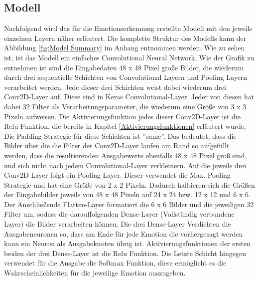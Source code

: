 \documentclass[12pt, a4paper]{report}
\begin{document}
\subsection{Modell}
Nachfolgend wird das für die Emotionserkennung erstellte Modell mit den jeweils einzelnen Layern näher erläutert. Die komplette Struktur des Modells kann der Abbildung \ref{fig:Model Summary} im Anhang entnommen werden.
Wie zu sehen ist, ist das Modell ein einfaches Convolutional Neural Network. 
Wie der Grafik zu entnehmen ist sind die Eingabedaten 48 x 48 Pixel große Bilder, die wiederum durch drei sequentielle Schichten von Convolutional Layern und Pooling Layern verarbeitet werden. Jede dieser drei Schichten weist dabei wiederum drei Conv2D-Layer auf. Diese sind in Keras Convolutional-Layer. Jeder von diesen hat dabei 32 Filter als Verarbeitungsparameter, die wiederum eine Größe von 3 x 3 Pixeln aufweisen. Die Aktivierungsfunktion jedes dieser Conv2D-Layer ist die Relu Funktion, die bereits in Kapitel \ref{Aktivierungsfunktionen} erläutert wurde. Die Padding-Strategie für diese Schichten ist ''same''. Das bedeutet, dass die Bilder über die die Filter der Conv2D-Layer laufen am Rand so aufgefüllt werden, dass die resultierenden Ausgabewerte ebenfalls 48 x 48 Pixel groß sind, und sich nicht nach jedem  Convolutional-Layer verkleinern. Auf die jeweils drei Conv2D-Layer folgt ein Pooling Layer. Dieser verwendet die Max. Pooling Strategie und hat eine Größe von 2 x 2 Pixeln. Dadurch halbieren sich die Größen der Eingabebilder jeweils von 48 x 48 Pixeln auf 24 x 24 bzw. 12 x 12 und 6 x 6. Der Anschließende Flatten-Layer formatiert die 6 x 6 Bilder und die jeweiligen 32 Filter um, sodass die darauffolgenden Dense-Layer (Vollständig verbundene Layer) die Bilder verarbeiten können. Die drei Dense-Layer Verdichten die Ausgabeneuronen so, dass am Ende für jede Emotion die vorhergesagt werden kann ein Neuron als Ausgabeknoten übrig ist. Aktivierungsfunktionen der ersten beiden der drei Dense-Layer ist die Relu Funktion. Die Letzte Schicht hingegen verwendet für die Ausgabe die Softmax Funktion, diese ermöglicht es die Wahrscheinlichkeiten für die jeweilige Emotion auszugeben.
\end{document}
